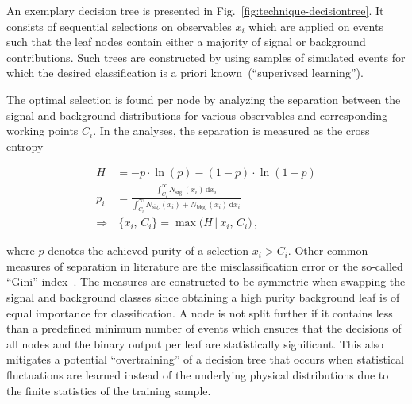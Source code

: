 An exemplary decision tree is presented in Fig.~\ref{fig:technique-decisiontree}. It consists of sequential selections on observables $x_{i}$ which are applied on events such that the leaf nodes contain either a majority of signal or background contributions. Such trees are constructed by using samples of simulated events for which the desired classification is a priori known~(``superivsed learning'').


The optimal selection is found per node by analyzing the separation between the signal and background distributions for various observables and corresponding working points $C_{i}$. In the analyses, the separation is measured as the cross entropy 

\begin{align}
H&=-p\cdot\ln(p)-(1-p)\cdot\ln(1-p)\\ p_{i}&=\frac{\int_{C_{i}}^{\infty} N_\mathrm{sig.}(x_{i})\,\mathrm{d}x_{i}}{\int_{C_{i}}^{\infty} N_\mathrm{sig.}(x_{i})+N_\mathrm{bkg.}(x_{i})\,\mathrm{d}x_{i}}\\
\Rightarrow &~\{x_{i},\,C_{i}\}=\max\Big(H\,\big|~x_{i},\,C_{i}\Big)\,,
\end{align}

where $p$ denotes the achieved purity of a selection $x_{i}>C_{i}$. Other common measures of separation in literature are the misclassification error or the so-called ``Gini'' index~\cite{Gini}. The measures are constructed to be symmetric when swapping the signal and background classes since obtaining a high purity background leaf is of equal importance for classification. A node is not split further if it contains less than a predefined minimum number of events which ensures that the decisions of all nodes and the binary output per leaf are statistically significant. This also mitigates a potential ``overtraining'' of a decision tree that occurs when statistical fluctuations are learned instead of the underlying physical distributions due to the finite statistics of the training sample.

